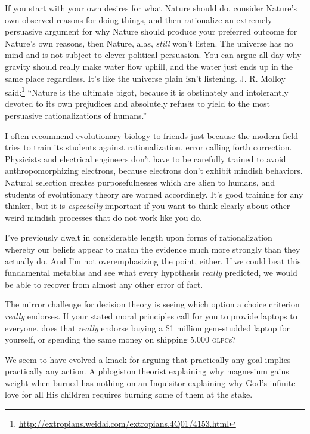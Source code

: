 If you start with your own desires for what Nature should do,
consider Nature's own observed reasons for doing
things, and then rationalize an extremely persuasive argument for why
Nature should produce your preferred outcome for
Nature's own reasons, then Nature, alas, \textit{still}
won't listen. The universe has no mind and is not
subject to clever political persuasion. You can argue all day why
gravity should really make water flow \textit{up}hill, and the water
just ends up in the same place regardless. It's like
the universe plain isn't listening. J. R. Molloy said:\footnote{\url{http://extropians.weidai.com/extropians.4Q01/4153.html}}
``Nature is the ultimate bigot, because it is
obstinately and intolerantly devoted to its own prejudices and
absolutely refuses to yield to the most persuasive rationalizations of
humans.''


 I often recommend evolutionary biology to friends just because the
modern field tries to train its students against rationalization, error
calling forth correction. Physicists and electrical engineers
don't have to be carefully trained to avoid
anthropomorphizing electrons, because electrons don't
exhibit mindish behaviors. Natural selection creates purposefulnesses
which are alien to humans, and students of evolutionary theory are
warned accordingly. It's good training for any thinker,
but it is \textit{especially} important if you want to think clearly
about other weird mindish processes that do not work like you do.

\myendsectiontext


\bigskip



 I've previously dwelt in considerable length upon
forms of rationalization whereby our beliefs appear to match the
evidence much more strongly than they actually do. And
I'm not overemphasizing the point, either. If we could
beat this fundamental metabias and see what every hypothesis
\textit{really} predicted, we would be able to recover from almost any
other error of fact. 


 The mirror challenge for decision theory is seeing which option a
choice criterion \textit{really} endorses. If your stated moral
principles call for you to provide laptops to everyone, does that
\textit{really} endorse buying a \$1 million gem-studded laptop for
yourself, or spending the same money on shipping 5,000 \textsc{olpc}s?


 We seem to have evolved a knack for arguing that practically any
goal implies practically any action. A phlogiston theorist explaining
why magnesium gains weight when burned has nothing on an Inquisitor
explaining why God's infinite love for all His children
requires burning some of them at the stake.


